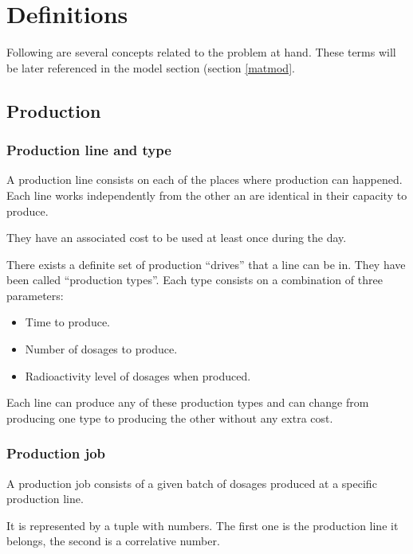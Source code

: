 \chapter{Definitions}
\label{def}


Following are several concepts related to the problem at hand. These terms will be later referenced in the model section (section \ref{matmod}.

\section{Production}

\subsection{Production line and type}
\label{def:lines}

A production line consists on each of the places where production can happened. Each line works independently from the other an are identical in their capacity to produce.

They have an associated cost to be used at least once during the day.

There exists a definite set of production "`drives"' that a line can be in. They have been called "`production types"'. Each type consists on a combination of three parameters:

\begin{itemize}
	\item Time to produce.
	\item Number of dosages to produce.
	\item Radioactivity level of dosages when produced.
\end{itemize}

Each line can produce any of these production types and can change from producing one type to producing the other without any extra cost.

\subsection{Production job}

A production job consists of a given batch of dosages produced at a specific production line.

It is represented by a tuple with numbers. The first one is the production line it belongs, the second is a correlative number.

